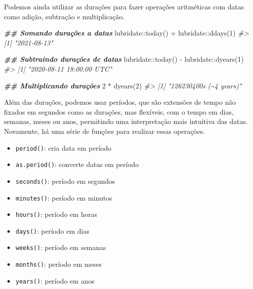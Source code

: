 \documentclass[
]{book}
\newenvironment{Shaded}{\begin{snugshade}}{\end{snugshade}}
\newcommand{\CommentTok}[1]{\textcolor[rgb]{0.37,0.37,0.37}{\textit{#1}}}
\newcommand{\DecValTok}[1]{\textcolor[rgb]{0.06,0.06,0.06}{#1}}
\newcommand{\DocumentationTok}[1]{\textcolor[rgb]{0.37,0.37,0.37}{\textbf{\textit{#1}}}}
\newcommand{\FunctionTok}[1]{\textcolor[rgb]{0,0,0}{#1}}
\newcommand{\NormalTok}[1]{#1}
\newcommand{\SpecialCharTok}[1]{\textcolor[rgb]{0,0,0}{#1}}
\providecommand{\tightlist}{%
  \setlength{\itemsep}{0pt}\setlength{\parskip}{0pt}}
\begin{document}
Podemos ainda utilizar as durações para fazer operações aritméticas com datas como adição, subtração e multiplicação.

\begin{Shaded}
\begin{Highlighting}[]
\DocumentationTok{\#\# Somando durações a datas}
\NormalTok{lubridate}\SpecialCharTok{::}\FunctionTok{today}\NormalTok{() }\SpecialCharTok{+}\NormalTok{ lubridate}\SpecialCharTok{::}\FunctionTok{ddays}\NormalTok{(}\DecValTok{1}\NormalTok{)}
\CommentTok{\#\textgreater{} [1] "2021{-}08{-}13"}

\DocumentationTok{\#\# Subtraindo durações de datas}
\NormalTok{lubridate}\SpecialCharTok{::}\FunctionTok{today}\NormalTok{() }\SpecialCharTok{{-}}\NormalTok{ lubridate}\SpecialCharTok{::}\FunctionTok{dyears}\NormalTok{(}\DecValTok{1}\NormalTok{)}
\CommentTok{\#\textgreater{} [1] "2020{-}08{-}11 18:00:00 UTC"}

\DocumentationTok{\#\# Multiplicando durações}
\DecValTok{2} \SpecialCharTok{*} \FunctionTok{dyears}\NormalTok{(}\DecValTok{2}\NormalTok{)}
\CommentTok{\#\textgreater{} [1] "126230400s (\textasciitilde{}4 years)"}
\end{Highlighting}
\end{Shaded}

Além das durações, podemos usar períodos, que são extensões de tempo não fixados em segundos como as durações, mas flexíveis, com o tempo em dias, semanas, meses ou anos, permitindo uma interpretação mais intuitiva das datas. Novamente, há uma série de funções para realizar essas operações.

\begin{itemize}
\tightlist
\item
  \texttt{period()}: cria data em período
\item
  \texttt{as.period()}: converte datas em período
\item
  \texttt{seconds()}: período em segundos
\item
  \texttt{minutes()}: período em minutos
\item
  \texttt{hours()}: período em horas
\item
  \texttt{days()}: período em dias
\item
  \texttt{weeks()}: período em semanas
\item
  \texttt{months()}: período em meses
\item
  \texttt{years()}: período em anos
\end{itemize}
\end{document}
